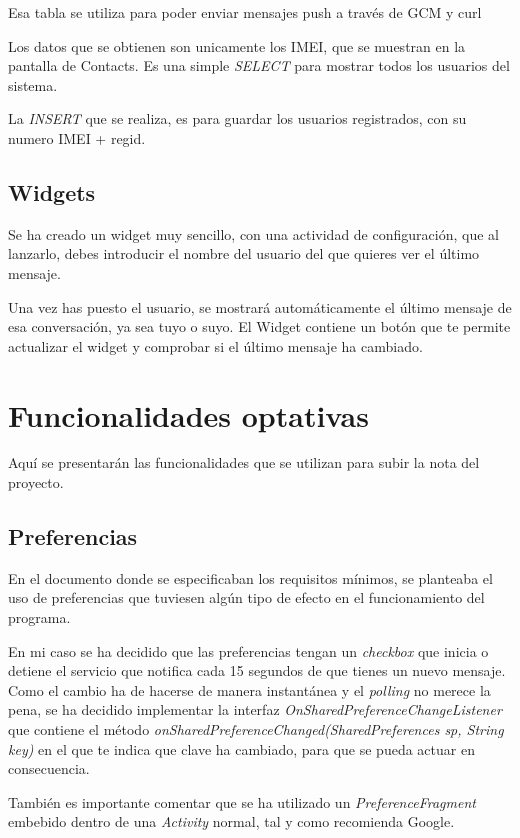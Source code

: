 \documentclass[]{article}
\begin{document}
Esa tabla se utiliza para poder enviar mensajes push a trav\'es de GCM y curl

Los datos que se obtienen son unicamente los IMEI, que se muestran en la pantalla de Contacts. Es una simple \emph{SELECT}
para mostrar todos los usuarios del sistema.

La \emph{INSERT} que se realiza, es para guardar los usuarios registrados, con su numero IMEI + regid.

\subsection{Widgets}
Se ha creado un widget muy sencillo, con una actividad de configuraci\'on, que al lanzarlo, debes introducir el nombre del usuario
del que quieres ver el \'ultimo mensaje.

Una vez has puesto el usuario, se mostrar\'a autom\'aticamente el \'ultimo mensaje de esa conversaci\'on, ya sea tuyo o suyo. El
Widget contiene un bot\'on que te permite actualizar el widget y comprobar si el \'ultimo mensaje ha cambiado.

\section{Funcionalidades optativas}
Aqu\'i se presentar\'an las funcionalidades que se utilizan para subir la nota del proyecto.

\subsection{Preferencias}
En el documento donde se especificaban los requisitos m\'inimos, se planteaba el uso de preferencias que tuviesen alg\'un tipo
de efecto en el funcionamiento del programa.

En mi caso se ha decidido que las preferencias tengan un \emph{checkbox} que inicia o detiene el servicio que notifica cada
15 segundos de que tienes un nuevo mensaje. Como el cambio ha de hacerse de manera instant\'anea y el \emph{polling} no
merece la pena, se ha decidido implementar la interfaz \emph{OnSharedPreferenceChangeListener} que contiene el m\'etodo
\emph{onSharedPreferenceChanged(SharedPreferences sp, String key)} en el que te indica que clave ha cambiado, para que se
pueda actuar en consecuencia.

Tambi\'en es importante comentar que se ha utilizado un \emph{PreferenceFragment} embebido dentro de una \emph{Activity}
normal, tal y como recomienda Google.
\end{document}
